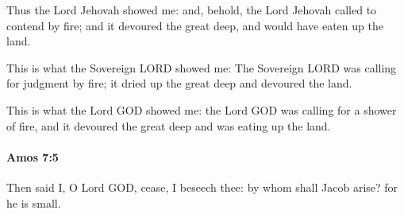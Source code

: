 			\begin{versebox}
					\item[BHS] 
					\item[LXX] 
					\item[ASV] Thus the Lord Jehovah showed me: and, behold, the Lord Jehovah called to contend by fire; and it devoured the great deep, and would have eaten up the land.
					\item[NIV] This is what the Sovereign LORD showed me: The Sovereign LORD was calling for judgment by fire; it dried up the great deep and devoured the land.
					\item[NRSV] This is what the Lord GOD showed me: the Lord GOD was calling for a shower of fire, and it devoured the great deep and was eating up the land.
			\end{versebox}

		\paragraph{Amos 7:5} %
			\label{AMOS-7-5}

			Then said I, O Lord GOD, cease, I beseech thee: by whom shall Jacob arise? for he is small.

